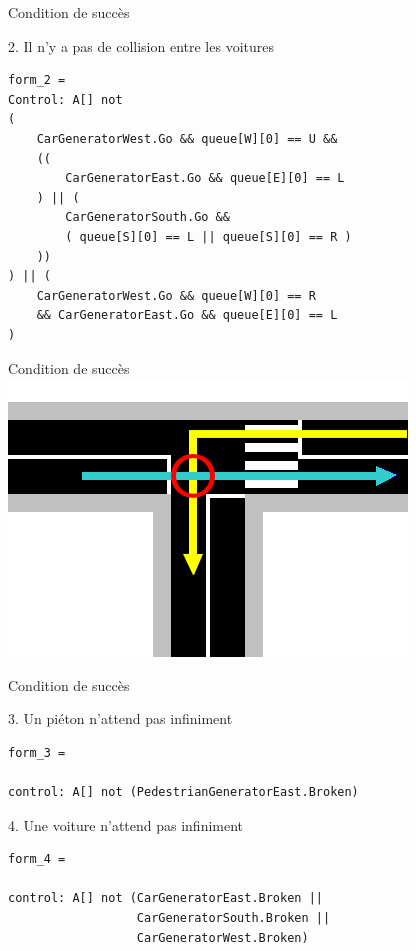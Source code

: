 \documentclass{bredelebeamer}
\begin{document}
\begin{frame}[fragile]{Condition de succès}
\begin{block}{2. Il n'y a pas de collision entre les voitures}
\begin{verbatim}
form_2 = 
Control: A[] not
(
    CarGeneratorWest.Go && queue[W][0] == U && 
    ((
        CarGeneratorEast.Go && queue[E][0] == L
    ) || (
        CarGeneratorSouth.Go && 
        ( queue[S][0] == L || queue[S][0] == R )
    ))
) || (
    CarGeneratorWest.Go && queue[W][0] == R 
    && CarGeneratorEast.Go && queue[E][0] == L
)
\end{verbatim}
\end{block}

\end{frame}
\begin{frame}[fragile]{Condition de succès}
\centering
\includegraphics[scale=0.8]{images/exempleCollision.png}

\end{frame}


\begin{frame}[fragile]{Condition de succès}
\begin{block}{3. Un piéton n'attend pas infiniment}
\begin{verbatim}
form_3 = 

control: A[] not (PedestrianGeneratorEast.Broken)
\end{verbatim}
\end{block}

\begin{block}{4. Une voiture n'attend pas infiniment}
\begin{verbatim}
form_4 = 

control: A[] not (CarGeneratorEast.Broken ||
                  CarGeneratorSouth.Broken ||
                  CarGeneratorWest.Broken)
\end{verbatim}
\end{block}

\end{frame}
\end{document}

